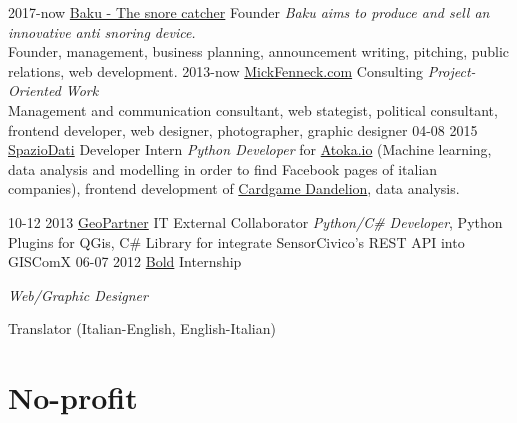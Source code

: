 \documentclass[]{friggeri-cv}
\begin{document}
\begin{entrylist}
\entry
    {2017-now}
    {\href{http://snorecatcher.it/it/benvenuti.html}{Baku - The snore catcher}}
    {Founder}
    {\emph{Baku aims to produce and sell an innovative anti snoring device.}\\
    {Founder, management, business planning, announcement writing, pitching, public relations, web development.}
    }
\entry
    {2013-now}
    {\href{http://www.mickfenneck.com}{MickFenneck.com}}
    {Consulting}
    {\emph{Project-Oriented Work}\\
    {Management and communication consultant, web stategist, political consultant, frontend developer, web designer, photographer, graphic designer}
    }
\entry
    {04-08 2015}
    {\href{https://spaziodati.eu/en/}{SpazioDati}}
    {Developer Intern}
    {\emph{Python Developer} for \href{https://atoka.io/en/}{Atoka.io} (Machine learning, data analysis and modelling in order to find Facebook pages of italian companies), frontend development of \href{http://cardgame.dandelion.eu}{Cardgame Dandelion}, data analysis.
    }
\end{entrylist}
\begin{entrylist}
\entry
    {10-12 2013}
    {\href{http://www.geopartner.it}{GeoPartner}}
    {IT External Collaborator}
    {\emph{Python/C\# Developer}, Python Plugins for QGis, C\# Library for integrate SensorCivico's REST API into GISComX
    }
\entry
    {06-07 2012}
    {\href{http://www.studiobold.it}{Bold}}
    {Internship}
    {\emph{Web/Graphic Designer}

    {Translator (Italian-English, English-Italian)}}
\end{entrylist}



\section{No-profit}
\end{document}
